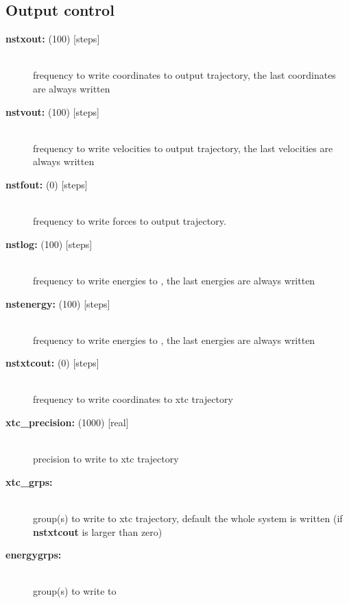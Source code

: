 \subsection{Output control}
\begin{description}
\item[{\bf nstxout: }(100) {[steps]}]\mbox{}\\
frequency to write coordinates to output trajectory,
the last coordinates are always written
\item[{\bf nstvout: }(100) {[steps]}]\mbox{}\\
frequency  to write velocities to output trajectory,
the last velocities are always written
\item[{\bf nstfout: }(0) {[steps]}]\mbox{}\\
frequency to write forces to output trajectory.
\item[{\bf nstlog: }(100) {[steps]}]\mbox{}\\
frequency to write energies to ,
the last energies are always written
\item[{\bf nstenergy: }(100) {[steps]}]\mbox{}\\
frequency to write energies to ,
the last energies are always written
\item[{\bf nstxtcout: }(0) {[steps]}]\mbox{}\\
frequency to write coordinates to xtc trajectory
\item[{\bf xtc\_precision: }(1000) {[real]}]\mbox{}\\
precision to write to xtc trajectory
\item[{\bf xtc\_grps:}]\mbox{}\\
group(s) to write to xtc trajectory, default the whole system is written
(if {\bf nstxtcout} is larger than zero)  
\item[{\bf energygrps:}]\mbox{}\\
group(s) to write to 
\end{description}


